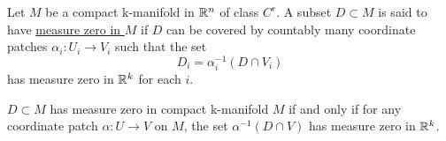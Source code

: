\begin{definition}
    Let $M$ be a compact k-manifold in $\mathbb{R}^n$ of class $C^r$. A subset $D\subset M$ is said to have \underline{measure zero in $M$} if $D$ can be covered by countably many coordinate patches $\alpha_i:U_i\longrightarrow V_i$ such that the set $$D_i=\alpha_i^{-1}(D\cap V_i)$$ has measure zero in $\mathbb{R}^k$ for each $i$. 
\end{definition}

\begin{theorem}
    $D\subset M$ has measure zero in compact k-manifold $M$ if and only if for any coordinate patch $\alpha:U\longrightarrow V$ on $M$, the set $\alpha^{-1}(D\cap V)$ has measure zero in $\mathbb{R}^k$.
\end{theorem}

